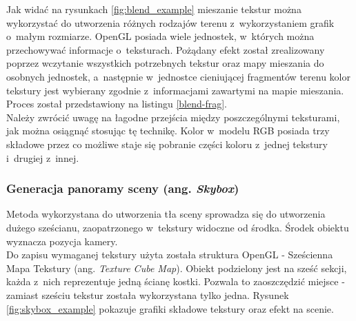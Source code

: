 \documentclass[a4paper,twoside,12pt]{book}
\newcommand{\obcy}[1]{\emph{#1}}
\newcommand{\ang}[1]{{\selectlanguage{british}\obcy{#1}}}
\begin{document}
Jak widać na rysunkach \ref{fig:blend_example} mieszanie tekstur można wykorzystać do utworzenia różnych rodzajów terenu z~wykorzystaniem grafik o~małym rozmiarze. OpenGL posiada wiele jednostek, w~których można przechowywać informacje o~teksturach. Pożądany efekt został zrealizowany poprzez wczytanie wszystkich potrzebnych tekstur oraz mapy mieszania do osobnych jednostek, a~następnie w~jednostce cieniującej fragmentów terenu kolor tekstury jest wybierany zgodnie z~informacjami zawartymi na mapie mieszania. Proces został przedstawiony na listingu \ref{blend-frag}. \\
Należy zwrócić uwagę na łagodne przejścia między poszczególnymi teksturami, jak można osiągnąć stosując tę technikę. Kolor w~modelu RGB posiada trzy składowe przez co możliwe staje się pobranie części koloru z~jednej tekstury i~drugiej z~innej.



\subsubsection{Generacja panoramy sceny (ang. \ang{Skybox})}
Metoda wykorzystana do utworzenia tła sceny sprowadza się do utworzenia dużego sześcianu, zaopatrzonego w~tekstury widoczne od środka. Środek obiektu wyznacza pozycja kamery. \\
Do zapisu wymaganej tekstury użyta została struktura OpenGL - Sześcienna Mapa Tekstury (ang. \ang{Texture Cube Map}). Obiekt podzielony jest na sześć sekcji, każda z~nich reprezentuje jedną ścianę kostki. Pozwala to zaoszczędzić miejsce - zamiast sześciu tekstur została wykorzystana tylko jedna. Rysunek \ref{fig:skybox_example} pokazuje grafiki składowe tekstury oraz efekt na scenie.
\end{document}
